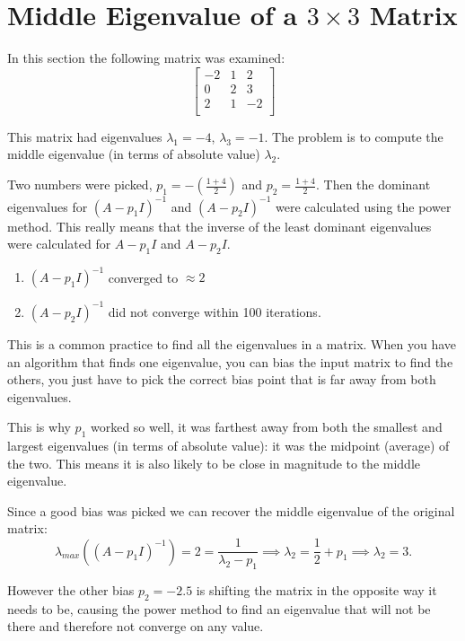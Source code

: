 \documentclass{article}
\begin{document}
\pagebreak

\section{Middle Eigenvalue of a $3 \times 3$ Matrix}

In this section the following matrix was examined:
$$
\begin{bmatrix}
    -2 & 1 &  2 \\
     0 & 2 &  3 \\
     2 & 1 & -2 \\
\end{bmatrix}
$$

This matrix had eigenvalues $\lambda_1 = -4$, $\lambda_3 = -1$. The problem is to compute
the middle eigenvalue (in terms of absolute value) $\lambda_2$.

Two numbers were picked, $p_1 = -(\frac{1 + 4}{2})$ and $p_2 = \frac{1 + 4}{2}$.
Then the dominant eigenvalues for $(A - p_1I)^{-1}$ and $(A - p_2I)^{-1}$
were calculated using the power method.
This really means that the inverse of the least dominant eigenvalues were calculated for
$A - p_1I$ and $A - p_2I$.

\begin{enumerate}
    \item $(A - p_1I)^{-1}$ converged to $\approx 2$
    \item $(A - p_2I)^{-1}$ did not converge within 100 iterations.
\end{enumerate}

This is a common practice to find all the eigenvalues in a matrix.
When you have an algorithm that finds one eigenvalue, you can bias the input matrix to
find the others, you just have to pick the correct bias point that is far away from
both eigenvalues.

This is why $p_1$ worked so well, it was farthest away from both the smallest and largest
eigenvalues (in terms of absolute value): it was the midpoint (average) of the two. This
means it is also likely to be close in magnitude to the middle eigenvalue.

Since a good bias was picked we can recover the middle eigenvalue of the original matrix:
$$
\lambda_{max}((A - p_1I)^{-1}) = 2 = \frac{1}{\lambda_2 - p_1} \implies \lambda_2 = \frac{1}{2} + p_1 \implies \lambda_2 = 3.
$$

However the other bias $p_2 = -2.5$ is shifting the matrix in the opposite way it needs to
be, causing the power method to find an eigenvalue that will not be there and therefore
not converge on any value.
\end{document}
